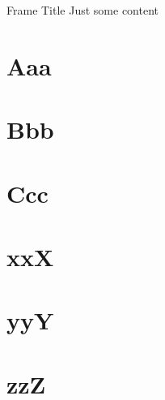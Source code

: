\documentclass[aspectratio=169]{beamer}
\begin{document}
\frame{\sectionpage}

\begin{frame}{Frame Title}
Just some content
\end{frame}


\section{Aaa}
\frame{\sectionpage}

\section{Bbb}
\frame{\sectionpage}

\section{Ccc}
\frame{\sectionpage}

\section{xxX}
\frame{\sectionpage}

\section{yyY}
\frame{\sectionpage}

\section{zzZ}
\frame{\sectionpage}
\end{document}
